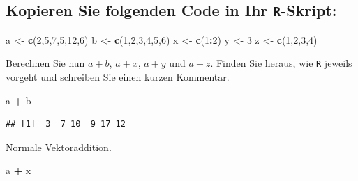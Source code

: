 \documentclass[12pt,a4paper]{article}
\newenvironment{Shaded}{\begin{snugshade}}{\end{snugshade}}
\newcommand{\DecValTok}[1]{\textcolor[rgb]{0.00,0.00,0.81}{#1}}
\newcommand{\FunctionTok}[1]{\textcolor[rgb]{0.13,0.29,0.53}{\textbf{#1}}}
\newcommand{\NormalTok}[1]{#1}
\newcommand{\OtherTok}[1]{\textcolor[rgb]{0.56,0.35,0.01}{#1}}
\newcommand{\SpecialCharTok}[1]{\textcolor[rgb]{0.81,0.36,0.00}{\textbf{#1}}}
\begin{document}
\vspace{0.5cm}

\hypertarget{kopieren-sie-folgenden-code-in-ihr--skript}{%
\subsection{\texorpdfstring{Kopieren Sie folgenden Code in Ihr
\texttt{R}-Skript:}{Kopieren Sie folgenden Code in Ihr -Skript:}}\label{kopieren-sie-folgenden-code-in-ihr--skript}}

\begin{Shaded}
\begin{Highlighting}[]
\NormalTok{    a }\OtherTok{\textless{}{-}} \FunctionTok{c}\NormalTok{(}\DecValTok{2}\NormalTok{,}\DecValTok{5}\NormalTok{,}\DecValTok{7}\NormalTok{,}\DecValTok{5}\NormalTok{,}\DecValTok{12}\NormalTok{,}\DecValTok{6}\NormalTok{)}
\NormalTok{    b }\OtherTok{\textless{}{-}} \FunctionTok{c}\NormalTok{(}\DecValTok{1}\NormalTok{,}\DecValTok{2}\NormalTok{,}\DecValTok{3}\NormalTok{,}\DecValTok{4}\NormalTok{,}\DecValTok{5}\NormalTok{,}\DecValTok{6}\NormalTok{)}
\NormalTok{    x }\OtherTok{\textless{}{-}} \FunctionTok{c}\NormalTok{(}\DecValTok{1}\SpecialCharTok{:}\DecValTok{2}\NormalTok{)}
\NormalTok{    y }\OtherTok{\textless{}{-}} \DecValTok{3}
\NormalTok{    z }\OtherTok{\textless{}{-}} \FunctionTok{c}\NormalTok{(}\DecValTok{1}\NormalTok{,}\DecValTok{2}\NormalTok{,}\DecValTok{3}\NormalTok{,}\DecValTok{4}\NormalTok{)}
\end{Highlighting}
\end{Shaded}

Berechnen Sie nun \(a+b\), \(a+x\), \(a+y\) und \(a+z\). Finden Sie
heraus, wie \texttt{R} jeweils vorgeht und schreiben Sie einen kurzen
Kommentar.

\begin{Shaded}
\begin{Highlighting}[]
\NormalTok{    a }\SpecialCharTok{+}\NormalTok{ b }
\end{Highlighting}
\end{Shaded}

\begin{verbatim}
## [1]  3  7 10  9 17 12
\end{verbatim}

Normale Vektoraddition.

\begin{Shaded}
\begin{Highlighting}[]
\NormalTok{    a }\SpecialCharTok{+}\NormalTok{ x}
\end{Highlighting}
\end{Shaded}
\end{document}
